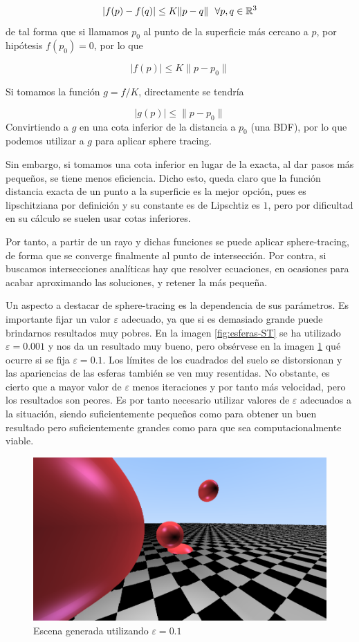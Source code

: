 $$
|f(p)-f(q)|\leq K \|p-q\| \ \ \forall p,q\in\mathbb{R}^3 
$$
de tal forma que si llamamos $p_0$ al punto de la superficie más cercano a $p$, por hipótesis $f(p_0)=0$, por lo que

$$
|f(p)|\leq K \| p-p_0\|
$$

Si tomamos la función $g=f/K$, directamente se tendría 

$$
|g(p)|\leq\|p-p_0\|
$$
Convirtiendo a $g$ en una cota inferior de la distancia a $p_0$ (una BDF), por lo que podemos utilizar a $g$ para aplicar sphere tracing.

Sin embargo, si tomamos una cota inferior en lugar de la exacta, al dar pasos más pequeños, se tiene menos eficiencia. Dicho esto, queda claro que la función distancia exacta de un punto a la superficie es la mejor opción, pues es lipschitziana por definición y su constante es de Lipschtiz es $1$, pero por dificultad en su cálculo se suelen usar cotas inferiores.

Por tanto, a partir de un rayo y dichas funciones se puede aplicar sphere-tracing, de forma que se converge finalmente al punto de intersección. Por contra, si buscamos intersecciones analíticas hay que resolver ecuaciones, en ocasiones para acabar aproximando las soluciones, y retener la más pequeña. 

Un aspecto a destacar de sphere-tracing es la dependencia de sus parámetros. Es importante fijar un valor $\varepsilon$ adecuado, ya que si es demasiado grande puede brindarnos resultados muy pobres. En la imagen \ref{fig:esferas-ST} se ha utilizado $\varepsilon=0.001$ y nos da un resultado muy bueno, pero obsérvese en la imagen \ref{fig:epsilon-grande} qué ocurre si se fija $\varepsilon=0.1$. Los límites de los cuadrados del suelo se distorsionan y las apariencias de las esferas también se ven muy resentidas. No obstante, es cierto que a mayor valor de $\varepsilon$ menos iteraciones y por tanto más velocidad, pero los resultados son peores. Es por tanto necesario utilizar valores de $\varepsilon$ adecuados a la situación, siendo suficientemente pequeños como para obtener un buen resultado pero suficientemente grandes como para que sea computacionalmente viable.

\begin{figure} [ht]
    \centering
    \includegraphics[scale = 0.3]{img/C8/epsilon-grande.png}
    \caption{Escena generada utilizando $\varepsilon=0.1$}
    \label{fig:epsilon-grande}
\end{figure}

